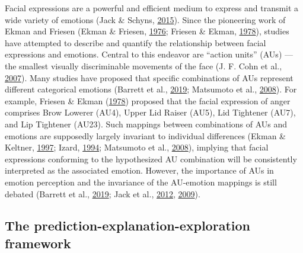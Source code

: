 \documentclass[12pt,american,a4paper,oneside,]{memoir} %
\begin{document}
Facial expressions are a powerful and efficient medium to express and transmit a wide variety of emotions (Jack \& Schyns, \protect\hyperlink{ref-Jack2015-sh}{2015}). Since the pioneering work of Ekman and Friesen (Ekman \& Friesen, \protect\hyperlink{ref-Ekman1976-hm}{1976}; Friesen \& Ekman, \protect\hyperlink{ref-Friesen1978-tp}{1978}), studies have attempted to describe and quantify the relationship between facial expressions and emotions. Central to this endeavor are ``action units'' (AUs) --- the smallest visually discriminable movements of the face (J. F. Cohn et al., \protect\hyperlink{ref-Cohn2007-az}{2007}). Many studies have proposed that specific combinations of AUs represent different categorical emotions (Barrett et al., \protect\hyperlink{ref-Barrett2019-bc}{2019}; Matsumoto et al., \protect\hyperlink{ref-Matsumoto2008-qk}{2008}). For example, Friesen \& Ekman (\protect\hyperlink{ref-Friesen1978-tp}{1978}) proposed that the facial expression of anger comprises Brow Lowerer (AU4), Upper Lid Raiser (AU5), Lid Tightener (AU7), and Lip Tightener (AU23). Such mappings between combinations of AUs and emotions are supposedly largely invariant to individual differences (Ekman \& Keltner, \protect\hyperlink{ref-Ekman1997-bk}{1997}; Izard, \protect\hyperlink{ref-Izard1994-ca}{1994}; Matsumoto et al., \protect\hyperlink{ref-Matsumoto2008-qk}{2008}), implying that facial expressions conforming to the hypothesized AU combination will be consistently interpreted as the associated emotion. However, the importance of AUs in emotion perception and the invariance of the AU-emotion mappings is still debated (Barrett et al., \protect\hyperlink{ref-Barrett2019-bc}{2019}; Jack et al., \protect\hyperlink{ref-Jack2012-eq}{2012}, \protect\hyperlink{ref-Jack2009-yy}{2009}).

\hypertarget{the-prediction-explanation-exploration-framework}{%
\subsection{The prediction-explanation-exploration framework}\label{the-prediction-explanation-exploration-framework}}
\end{document}
